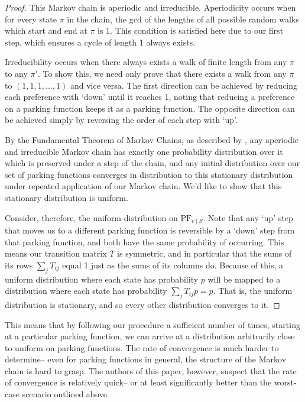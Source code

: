 \documentclass[12 pt]{amsart}
\theoremstyle{definition} %
\theoremstyle{remark} %
\begin{document}
\begin{proof}
    This Markov chain is aperiodic and irreducible. Aperiodicity occurs when for every state $\pi$ in the chain, the gcd of the lengths of all possible random walks which start and end at $\pi$ is 1. This condition is satisfied here due to our first step, which ensures a cycle of length 1 always exists.

    Irreducibility occurs when there always exists a walk of finite length from any $\pi$ to any $\pi'$. To show this, we need only prove that there exists a walk from any $\pi$ to $(1,1,1,...,1)$ and vice versa. The first direction can be achieved by reducing each preference with `down' until it reaches 1, noting that reducing a preference on a parking function keeps it as a parking  function. The opposite direction can be achieved simply by reversing the order of each step with `up'.

    By the Fundamental Theorem of Markov Chains, as described by \cite{biswas-2022}, any aperiodic and irreducible Markov chain has exactly one probability distribution over it which is preserved under a step of the chain, and any initial distribution over our set of parking functions converges in distribution to this stationary distribution under repeated application of our Markov chain. We'd like to show that this stationary distribution is uniform.

    Consider, therefore, the uniform distribution on $\mathrm{PF}_{c\mid S}$. Note that any `up' step that moves us to a different parking function is reversible by a `down' step from that parking function, and both have the same probability of occurring. This means our transition matrix $T$ is symmetric, and in particular that the sums of its rows $\sum_j T_{ij}$ equal 1 just as the sums of its columns do. Because of this, a uniform distribution where each state has probability $p$ will be mapped to a distribution where each state has probability $\sum_j T_{ij}p=p$. That is, the uniform distribution is stationary, and so every other distribution converges to it.
\end{proof}

This means that by following our procedure a sufficient number of times, starting at a particular parking function, we can arrive at a distribution arbitrarily close to uniform on parking functions. The rate of convergence is much harder to determine-- even for parking functions in general, the structure of the Markov chain is hard to grasp. The authors of this paper, however, suspect that the rate of convergence is relatively quick-- or at least significantly better than the worst-case scenario outlined above.
\end{document}

